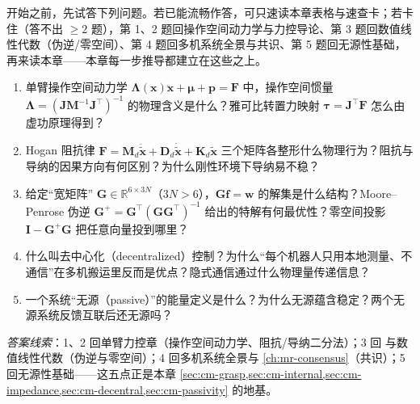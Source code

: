 \begin{practice}[前置自测]
开始之前，先试答下列问题。若已能流畅作答，可只速读本章表格与速查卡；若卡住（答不出 $\ge 2$ 题），第 1、2 题回操作空间动力学与力控导论、第 3 题回数值线性代数（伪逆/零空间）、第 4 题回多机系统全景与共识、第 5 题回无源性基础，再来读本章——本章每一步推导都建立在这些之上。
\begin{enumerate}
  \item 单臂操作空间动力学 $\boldsymbol{\Lambda}(\mathbf{x})\ddot{\mathbf{x}}+\boldsymbol{\mu}+\mathbf{p}=\mathbf{F}$ 中，操作空间惯量 $\boldsymbol{\Lambda}=(\mathbf{J}\mathbf{M}^{-1}\mathbf{J}^\top)^{-1}$ 的物理含义是什么？雅可比转置力映射 $\boldsymbol{\tau}=\mathbf{J}^\top\mathbf{F}$ 怎么由虚功原理得到？
  \item Hogan 阻抗律 $\mathbf{F}=\mathbf{M}_d\ddot{\tilde{\mathbf{x}}}+\mathbf{D}_d\dot{\tilde{\mathbf{x}}}+\mathbf{K}_d\tilde{\mathbf{x}}$ 三个矩阵各整形什么物理行为？阻抗与导纳的因果方向有何区别？为什么刚性环境下导纳易不稳？
  \item 给定“宽矩阵” $\mathbf{G}\in\mathbb{R}^{6\times 3N}$（$3N>6$），$\mathbf{G}\mathbf{f}=\mathbf{w}$ 的解集是什么结构？Moore--Penrose 伪逆 $\mathbf{G}^{+}=\mathbf{G}^\top(\mathbf{G}\mathbf{G}^\top)^{-1}$ 给出的特解有何最优性？零空间投影 $\mathbf{I}-\mathbf{G}^{+}\mathbf{G}$ 把任意向量投到哪里？
  \item 什么叫去中心化（decentralized）控制？为什么“每个机器人只用本地测量、不通信”在多机搬运里反而是优点？隐式通信通过什么物理量传递信息？
  \item 一个系统“无源（passive）”的能量定义是什么？为什么无源蕴含稳定？两个无源系统反馈互联后还无源吗？
\end{enumerate}
\noindent\emph{答案线索}：1、2 回单臂力控章（操作空间动力学、阻抗/导纳二分法）；3 回  与数值线性代数（伪逆与零空间）；4 回多机系统全景与 \cref{ch:mr-consensus}（共识）；5 回无源性基础——这五点正是本章 \cref{sec:cm-grasp,sec:cm-internal,sec:cm-impedance,sec:cm-decentral,sec:cm-passivity} 的地基。
\end{practice}

